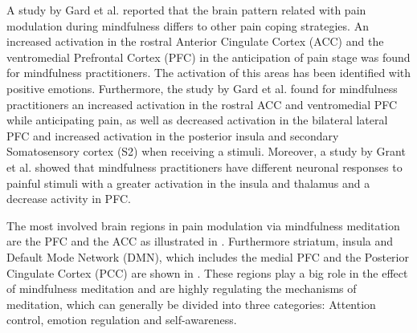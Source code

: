 
A study by Gard et al. \cite{Gard2012} reported that the brain pattern related with pain modulation during mindfulness differs to other pain coping strategies. An increased activation in the rostral Anterior Cingulate Cortex (ACC) and the ventromedial Prefrontal Cortex (PFC) in the anticipation of pain stage was found for mindfulness practitioners. The activation of this areas has been identified with positive emotions. Furthermore, the study by Gard et al. \cite{Gard2012} found for mindfulness practitioners an increased activation in the rostral ACC and ventromedial PFC while anticipating pain, as well as decreased activation in the bilateral lateral PFC and increased activation in the posterior insula and secondary Somatosensory cortex (S2) when receiving a stimuli. Moreover, a study by Grant et al. \cite{Grant2011} showed that mindfulness practitioners have different neuronal responses to painful stimuli with a greater activation in the insula and thalamus and a decrease activity in PFC.



The most involved brain regions in pain modulation via mindfulness meditation are the PFC and the ACC as illustrated in . Furthermore striatum, insula and Default Mode Network (DMN), which includes the medial PFC and the Posterior Cingulate Cortex (PCC) are shown in . These regions play a big role in the effect of mindfulness meditation and are highly regulating the mechanisms of meditation, which can generally be divided into three categories: Attention control, emotion regulation and self-awareness. 

